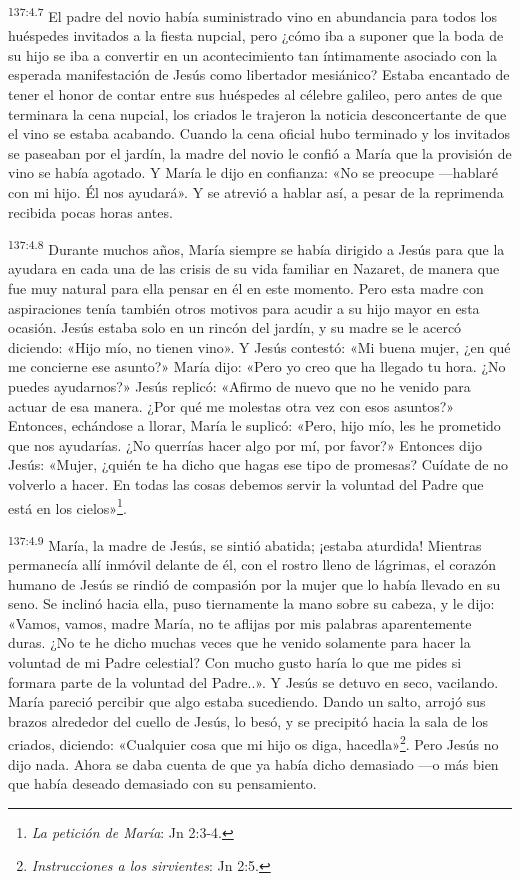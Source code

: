 \par 
\textsuperscript{137:4.7} El padre del novio había suministrado vino en abundancia para todos los huéspedes invitados a la fiesta nupcial, pero ¿cómo iba a suponer que la boda de su hijo se iba a convertir en un acontecimiento tan íntimamente asociado con la esperada manifestación de Jesús como libertador mesiánico? Estaba encantado de tener el honor de contar entre sus huéspedes al célebre galileo, pero antes de que terminara la cena nupcial, los criados le trajeron la noticia desconcertante de que el vino se estaba acabando. Cuando la cena oficial hubo terminado y los invitados se paseaban por el jardín, la madre del novio le confió a María que la provisión de vino se había agotado. Y María le dijo en confianza: «No se preocupe ---hablaré con mi hijo. Él nos ayudará». Y se atrevió a hablar así, a pesar de la reprimenda recibida pocas horas antes.

\par 
\textsuperscript{137:4.8} Durante muchos años, María siempre se había dirigido a Jesús para que la ayudara en cada una de las crisis de su vida familiar en Nazaret, de manera que fue muy natural para ella pensar en él en este momento. Pero esta madre con aspiraciones tenía también otros motivos para acudir a su hijo mayor en esta ocasión. Jesús estaba solo en un rincón del jardín, y su madre se le acercó diciendo: «Hijo mío, no tienen vino». Y Jesús contestó: «Mi buena mujer, ¿en qué me concierne ese asunto?» María dijo: «Pero yo creo que ha llegado tu hora. ¿No puedes ayudarnos?» Jesús replicó: «Afirmo de nuevo que no he venido para actuar de esa manera. ¿Por qué me molestas otra vez con esos asuntos?» Entonces, echándose a llorar, María le suplicó: «Pero, hijo mío, les he prometido que nos ayudarías. ¿No querrías hacer algo por mí, por favor?» Entonces dijo Jesús: «Mujer, ¿quién te ha dicho que hagas ese tipo de promesas? Cuídate de no volverlo a hacer. En todas las cosas debemos servir la voluntad del Padre que está en los cielos»\footnote{\textit{La petición de María}: Jn 2:3-4.}.

\par 
\textsuperscript{137:4.9} María, la madre de Jesús, se sintió abatida; ¡estaba aturdida! Mientras permanecía allí inmóvil delante de él, con el rostro lleno de lágrimas, el corazón humano de Jesús se rindió de compasión por la mujer que lo había llevado en su seno. Se inclinó hacia ella, puso tiernamente la mano sobre su cabeza, y le dijo: «Vamos, vamos, madre María, no te aflijas por mis palabras aparentemente duras. ¿No te he dicho muchas veces que he venido solamente para hacer la voluntad de mi Padre celestial? Con mucho gusto haría lo que me pides si formara parte de la voluntad del Padre..». Y Jesús se detuvo en seco, vacilando. María pareció percibir que algo estaba sucediendo. Dando un salto, arrojó sus brazos alrededor del cuello de Jesús, lo besó, y se precipitó hacia la sala de los criados, diciendo: «Cualquier cosa que mi hijo os diga, hacedla»\footnote{\textit{Instrucciones a los sirvientes}: Jn 2:5.}. Pero Jesús no dijo nada. Ahora se daba cuenta de que ya había dicho demasiado ---o más bien que había deseado demasiado con su pensamiento.

